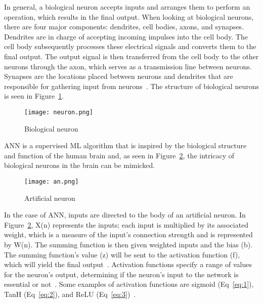 In general, a biological neuron accepts inputs and arranges them to perform an operation, which results in the final output. When looking at biological neurons, there are four major components: dendrites, cell bodies, axons, and synapses. Dendrites are in charge of accepting incoming impulses into the cell body. The cell body subsequently processes these electrical signals and converts them to the final output. The output signal is then transferred from the cell body to the other neurons through the axon, which serves as a transmission line between neurons. Synapses are the locations placed between neurons and dendrites that are responsible for gathering input from neurons~\cite{Imran2019AClassification}. The structure of biological neurons is seen in Figure~\ref{fig:neuron}. 
    
    \begin{figure}[htbp]
        \centering
        \texttt{[image: neuron.png]}
        \caption{Biological neuron~\cite{Deyoung1990ThinkingResearch}}
        \label{fig:neuron}
    \end{figure}
    
    \gls{ANN} is a supervised \gls{ML} algorithm that is inspired by the biological structure and function of the human brain and, as seen in Figure~\ref{fig:an}, the intricacy of biological neurons in the brain can be mimicked.
    
    \begin{figure}[htbp]
        \centering
        \texttt{[image: an.png]}
        \caption{Artificial neuron~\cite{Baheti12Choose}}
        \label{fig:an}
    \end{figure}
    
    In the case of \gls{ANN}, inputs are directed to the body of an artificial neuron. In Figure~\ref{fig:an}, X(n) represents the inputs; each input is multiplied by its associated weight, which is a measure of the input's connection strength and is represented by W(n). The summing function is then given weighted inputs and the bias (b). The summing function's value (z) will be sent to the activation function (f), which will yield the final output~\cite{Imran2019AClassification}. Activation functions specify a range of values for the neuron's output, determining if the neuron's input to the network is essential or not~\cite{2020ArtificialNetworks}. Some examples of activation functions are sigmoid (Eq~\ref{eq:1}), TanH (Eq~\ref{eq:2}), and ReLU (Eq~\ref{eq:3})~\cite{EnyinnaNwankpa2018ActivationLearning}.
    
